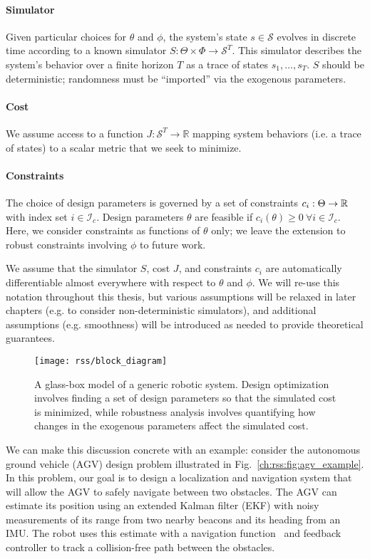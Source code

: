 \paragraph{Simulator} Given particular choices for $\theta$ and $\phi$, the system's state $s \in \mathcal{S}$ evolves in discrete time according to a known simulator $S : \Theta \times \Phi \rightarrow \mathcal{S}^T$. This simulator describes the system's behavior over a finite horizon $T$ as a trace of states $s_1, \ldots, s_T$. $S$ should be deterministic; randomness must be ``imported'' via the exogenous parameters.
\paragraph{Cost} We assume access to a function $J: \mathcal{S}^T \rightarrow \mathbb{R}$ mapping system behaviors (i.e. a trace of states) to a scalar metric that we seek to minimize.
\paragraph{Constraints} The choice of design parameters is governed by a set of constraints $c_i : \Theta \rightarrow \mathbb{R}$ with index set $i \in \mathcal{I}_c$. Design parameters $\theta$ are feasible if $c_i(\theta) \geq 0 \ \forall i \in \mathcal{I}_c$. Here, we consider constraints as functions of $\theta$ only; we leave the extension to robust constraints involving $\phi$ to future work.

We assume that the simulator $S$, cost $J$, and constraints $c_i$ are automatically differentiable almost everywhere with respect to $\theta$ and $\phi$. We will re-use this notation throughout this thesis, but various assumptions will be relaxed in later chapters (e.g. to consider non-deterministic simulators), and additional assumptions (e.g. smoothness) will be introduced as needed to provide theoretical guarantees.

\begin{figure}[t!]
	\centering
	\texttt{[image: rss/block\_diagram]}
	\caption{A glass-box model of a generic robotic system. Design optimization involves finding a set of design parameters so that the simulated cost is minimized, while robustness analysis involves quantifying how changes in the exogenous parameters affect the simulated cost.}
	\label{ch:rss:fig:block_diagram}
\end{figure}

We can make this discussion concrete with an example: consider the autonomous ground vehicle (AGV) design problem illustrated in Fig.~\ref{ch:rss:fig:agv_example}. In this problem, our goal is to design a localization and navigation system that will allow the AGV to safely navigate between two obstacles. The AGV can estimate its position using an extended Kalman filter (EKF) with noisy measurements of its range from two nearby beacons and its heading from an IMU. The robot uses this estimate with a navigation function~\cite{aiama} and feedback controller to track a collision-free path between the obstacles.

